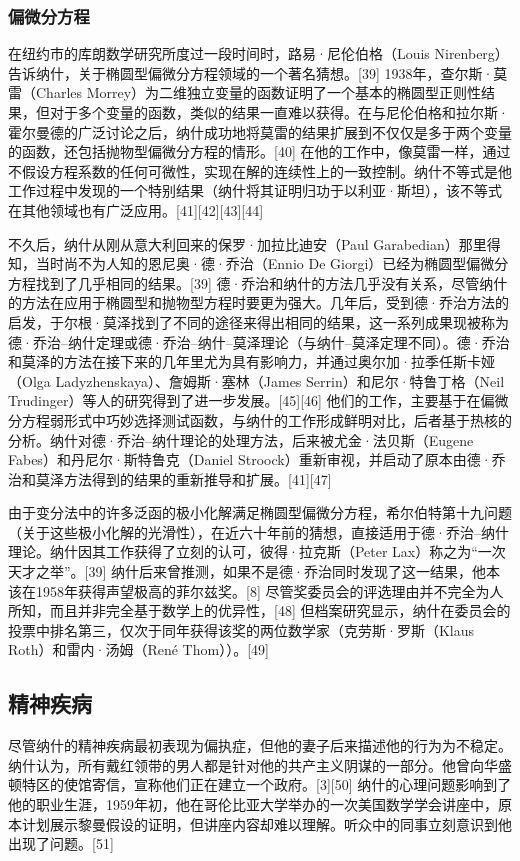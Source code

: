 \subsubsection{偏微分方程}
在纽约市的库朗数学研究所度过一段时间时，路易·尼伦伯格（Louis Nirenberg）告诉纳什，关于椭圆型偏微分方程领域的一个著名猜想。[39] 1938年，查尔斯·莫雷（Charles Morrey）为二维独立变量的函数证明了一个基本的椭圆型正则性结果，但对于多个变量的函数，类似的结果一直难以获得。在与尼伦伯格和拉尔斯·霍尔曼德的广泛讨论之后，纳什成功地将莫雷的结果扩展到不仅仅是多于两个变量的函数，还包括抛物型偏微分方程的情形。[40] 在他的工作中，像莫雷一样，通过不假设方程系数的任何可微性，实现在解的连续性上的一致控制。纳什不等式是他工作过程中发现的一个特别结果（纳什将其证明归功于以利亚·斯坦），该不等式在其他领域也有广泛应用。[41][42][43][44]

不久后，纳什从刚从意大利回来的保罗·加拉比迪安（Paul Garabedian）那里得知，当时尚不为人知的恩尼奥·德·乔治（Ennio De Giorgi）已经为椭圆型偏微分方程找到了几乎相同的结果。[39] 德·乔治和纳什的方法几乎没有关系，尽管纳什的方法在应用于椭圆型和抛物型方程时要更为强大。几年后，受到德·乔治方法的启发，于尔根·莫泽找到了不同的途径来得出相同的结果，这一系列成果现被称为德·乔治–纳什定理或德·乔治–纳什–莫泽理论（与纳什–莫泽定理不同）。德·乔治和莫泽的方法在接下来的几年里尤为具有影响力，并通过奥尔加·拉季任斯卡娅（Olga Ladyzhenskaya）、詹姆斯·塞林（James Serrin）和尼尔·特鲁丁格（Neil Trudinger）等人的研究得到了进一步发展。[45][46] 他们的工作，主要基于在偏微分方程弱形式中巧妙选择测试函数，与纳什的工作形成鲜明对比，后者基于热核的分析。纳什对德·乔治–纳什理论的处理方法，后来被尤金·法贝斯（Eugene Fabes）和丹尼尔·斯特鲁克（Daniel Stroock）重新审视，并启动了原本由德·乔治和莫泽方法得到的结果的重新推导和扩展。[41][47]

由于变分法中的许多泛函的极小化解满足椭圆型偏微分方程，希尔伯特第十九问题（关于这些极小化解的光滑性），在近六十年前的猜想，直接适用于德·乔治–纳什理论。纳什因其工作获得了立刻的认可，彼得·拉克斯（Peter Lax）称之为“一次天才之举”。[39] 纳什后来曾推测，如果不是德·乔治同时发现了这一结果，他本该在1958年获得声望极高的菲尔兹奖。[8] 尽管奖委员会的评选理由并不完全为人所知，而且并非完全基于数学上的优异性，[48] 但档案研究显示，纳什在委员会的投票中排名第三，仅次于同年获得该奖的两位数学家（克劳斯·罗斯（Klaus Roth）和雷内·汤姆（René Thom））。[49]
\subsection{精神疾病}
尽管纳什的精神疾病最初表现为偏执症，但他的妻子后来描述他的行为为不稳定。纳什认为，所有戴红领带的男人都是针对他的共产主义阴谋的一部分。他曾向华盛顿特区的使馆寄信，宣称他们正在建立一个政府。[3][50] 纳什的心理问题影响到了他的职业生涯，1959年初，他在哥伦比亚大学举办的一次美国数学学会讲座中，原本计划展示黎曼假设的证明，但讲座内容却难以理解。听众中的同事立刻意识到他出现了问题。[51]

